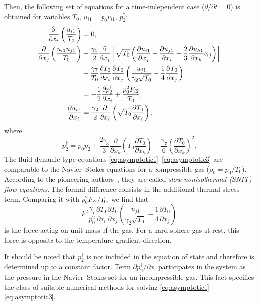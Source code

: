 \documentclass[smallextended]{svjour3} %
\newcommand{\pder}[2][]{\frac{\partial#1}{\partial#2}}
\newcommand{\Pder}[2][]{\partial#1/\partial#2}
\begin{document}
Then, the following set of equations for a time-independent case (\(\Pder{t} = 0\))
is obtained for variables \(T_0\), \(u_{i1} = p_0v_{i1}\), \(p_2^\dag\):
\begin{align}
    \pder{x_i}\left(\frac{u_{i1}}{T_0}\right) &= 0, \label{eq:asymptotic1} \\
    \pder{x_j}\left(\frac{u_{i1}u_{j1}}{T_0}\right)
        &-\frac{\gamma_1}2\pder{x_j}\left[\sqrt{T_0}\left(
            \pder[u_{i1}]{x_j} + \pder[u_{j1}]{x_i} - \frac23\pder[u_{k1}]{x_k}\delta_{ij}
        \right)\right] \notag\\
        &- \frac{\gamma_7}{T_0}\pder[T_0]{x_i}\pder[T_0]{x_j}\left(\frac{u_{j1}}{\gamma_2\sqrt{T_0}} - \frac{1}4\pder[T_0]{x_j}\right) \notag\\
        &= -\frac12\pder[p_2^\dag]{x_i} + \frac{p_0^2 F_{i2}}{T_0}, \label{eq:asymptotic2} \\
    \pder[u_{i1}]{x_i} &= \frac{\gamma_2}2\pder{x_i}\left(\sqrt{T_0}\pder[T_0]{x_i}\right), \label{eq:asymptotic3}
\end{align}
where
\begin{equation}\label{eq:dag_pressure}
    p_2^\dag = p_0 p_2
        + \frac{2\gamma_3}{3}\pder{x_k}\left(T_0\pder[T_0]{x_k}\right)
        - \frac{\gamma_7}{6}\left(\pder[T_0]{x_k}\right)^2.
\end{equation}
The fluid-dynamic-type equations \eqref{eq:asymptotic1}--\eqref{eq:asymptotic3}
are comparable to the Navier--Stokes equations for a compressible gas (\(\rho_0 = p_0/T_0\)).
According to the pioneering authors~\cite{Kogan1971, Kogan1976, ExperimentsNTFS2003},
they are called \emph{slow nonisothermal (SNIT) flow equations}.
The formal difference consists in the additional thermal-stress term.
Comparing it with \(p_0^2F_{i2}/T_0\), we find that
\begin{equation}\label{eq:force}
    k^2\frac{\gamma_7}{p_0^2}\pder[T_0]{x_i}\pder[T_0]{x_j}\left(\frac{u_{j1}}{\gamma_2\sqrt{T_0}} - \frac{1}4\pder[T_0]{x_j}\right)
\end{equation}
is the force acting on unit mass of the gas.
For a hard-sphere gas at rest, this force is opposite to the temperature gradient direction.

It should be noted that \(p_2^\dag\) is not included in the equation of state and
therefore is determined up to a constant factor.
Term \(\Pder[p_2^\dag]{x_i}\) participates in the system as the pressure
in the Navier--Stokes set for an incompressible gas.
This fact specifies the class of suitable numerical methods
for solving \eqref{eq:asymptotic1}--\eqref{eq:asymptotic3}.
\end{document}
